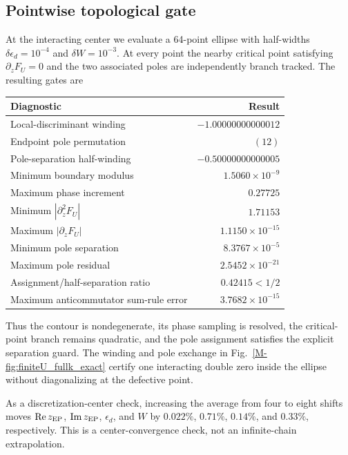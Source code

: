 \documentclass[%
  aps,prb,reprint,amsmath,amssymb,superscriptaddress,longbibliography,floatfix
]{revtex4-2}
\begin{document}
\subsection{Pointwise topological gate}

At the interacting center we evaluate a 64-point ellipse with half-widths
\(\delta\epsilon_d=10^{-4}\) and \(\delta W=10^{-3}\).  At every point the
nearby critical point satisfying \(\partial_zF_U=0\) and the two associated
poles are independently branch tracked.  The resulting gates are
\begin{center}
\begin{tabular}{@{}p{}r@{}}
\toprule
Diagnostic & Result\\
\midrule
Local-discriminant winding & \(-1.00000000000012\)\\
Endpoint pole permutation & \((12)\)\\
Pole-separation half-winding & \(-0.50000000000005\)\\
Minimum boundary modulus & \(1.5060\times10^{-9}\)\\
Maximum phase increment & \(0.27725\)\\
Minimum \(|\partial_z^2F_U|\) & \(1.71153\)\\
Maximum \(|\partial_zF_U|\) & \(1.1150\times10^{-15}\)\\
Minimum pole separation & \(8.3767\times10^{-5}\)\\
Maximum pole residual & \(2.5452\times10^{-21}\)\\
Assignment/half-separation ratio & \(0.42415<1/2\)\\
Maximum anticommutator sum-rule error & \(3.7682\times10^{-15}\)\\
\bottomrule
\end{tabular}
\end{center}
Thus the contour is nondegenerate, its phase sampling is resolved, the
critical-point branch remains quadratic, and the pole assignment satisfies
the explicit separation guard.  The winding and pole exchange in
Fig.~\ref{M-fig:finiteU_fullk_exact} certify one interacting double zero
inside the ellipse without diagonalizing at the defective point.

As a discretization-center check, increasing the average from four to eight
shifts moves \(\operatorname{Re}z_{\rm EP}\),
\(\operatorname{Im}z_{\rm EP}\), \(\epsilon_d\), and \(W\) by
\(0.022\%\), \(0.71\%\), \(0.14\%\), and \(0.33\%\), respectively.
This is a center-convergence check, not an infinite-chain extrapolation.
\end{document}
